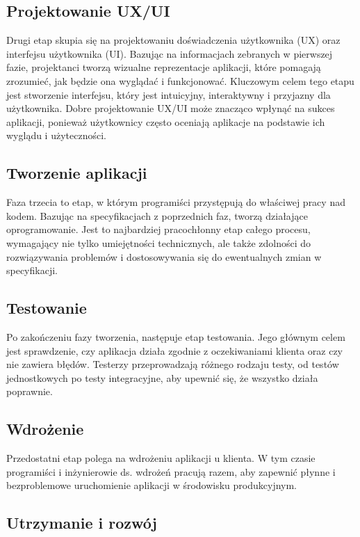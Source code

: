 \subsection{Projektowanie UX/UI}

Drugi etap skupia się na projektowaniu doświadczenia użytkownika (UX) oraz interfejsu użytkownika (UI). Bazując na informacjach zebranych w pierwszej fazie, projektanci tworzą wizualne reprezentacje aplikacji, które pomagają zrozumieć, jak będzie ona wyglądać i funkcjonować. Kluczowym celem tego etapu jest stworzenie interfejsu, który jest intuicyjny, interaktywny i przyjazny dla użytkownika. Dobre projektowanie UX/UI może znacząco wpłynąć na sukces aplikacji, ponieważ użytkownicy często oceniają aplikacje na podstawie ich wyglądu i użyteczności.

\subsection{Tworzenie aplikacji}

Faza trzecia to etap, w którym programiści przystępują do właściwej pracy nad kodem. Bazując na specyfikacjach z poprzednich faz, tworzą działające oprogramowanie. Jest to najbardziej pracochłonny etap całego procesu, wymagający nie tylko umiejętności technicznych, ale także zdolności do rozwiązywania problemów i dostosowywania się do ewentualnych zmian w specyfikacji.

\subsection{Testowanie}

Po zakończeniu fazy tworzenia, następuje etap testowania. Jego głównym celem jest sprawdzenie, czy aplikacja działa zgodnie z oczekiwaniami klienta oraz czy nie zawiera błędów. Testerzy przeprowadzają różnego rodzaju testy, od testów jednostkowych po testy integracyjne, aby upewnić się, że wszystko działa poprawnie.

\subsection{Wdrożenie}

Przedostatni etap polega na wdrożeniu aplikacji u klienta. W tym czasie programiści i inżynierowie ds. wdrożeń pracują razem, aby zapewnić płynne i bezproblemowe uruchomienie aplikacji w środowisku produkcyjnym.

\subsection{Utrzymanie i rozwój}

